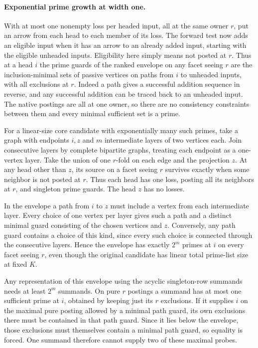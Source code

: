 \paragraph{Exponential prime growth at width one.}
With at most one nonempty loss per headed input, all at the
same owner $r$, put an arrow from each head to each member
of its loss. The forward test now adds an eligible input
when it has an arrow to an already added input, starting
with the eligible unheaded inputs. Eligibility here simply
means not posted at $r$. Thus at a head $i$ the prime guards
of the ranked envelope on any facet seeing $r$ are the
inclusion-minimal sets of passive vertices on paths from
$i$ to unheaded inputs, with all exclusions at $r$.
Indeed a path gives a successful addition sequence in
reverse, and any successful addition can be traced back
to an unheaded input. The native postings are all at one
owner, so there are no consistency constraints between
them and every minimal sufficient set is a prime.

For a linear-size core candidate with exponentially many
such primes, take a graph with endpoints $i,z$ and $m$
intermediate layers of two vertices each. Join consecutive
layers by complete bipartite graphs, treating each endpoint
as a one-vertex layer. Take the union of one $r$-fold on
each edge and the projection $z$. At any head other than
$z$, its source on a facet seeing $r$ survives exactly when
some neighbor is not posted at $r$. Thus each head has
one loss, posting all its neighbors at $r$, and singleton
prime guards. The head $z$ has no losses.

In the envelope a path from $i$ to $z$ must include a vertex
from each intermediate layer. Every choice of one vertex
per layer gives such a path and a distinct minimal guard
consisting of the chosen vertices and $z$. Conversely, any
path guard contains a choice of this kind, since every such
choice is connected through the consecutive layers. Hence
the envelope has exactly $2^m$ primes at $i$ on every facet
seeing $r$, even though the original candidate has linear
total prime-list size at fixed $K$.

Any representation of this envelope using the acyclic
singleton-row summands needs at least $2^m$ summands.
On pure $r$ postings a summand has at most one sufficient
prime at $i$, obtained by keeping just its $r$ exclusions.
If it supplies $i$ on the maximal pure posting allowed by
a minimal path guard, its own exclusions there must be
contained in that path guard. Since it lies below the
envelope, those exclusions must themselves contain a
minimal path guard, so equality is forced. One summand
therefore cannot supply two of these maximal probes.

